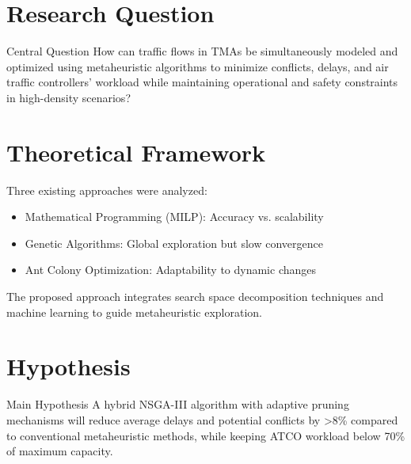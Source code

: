 \begin{minipage}{0.47\textwidth}

    \section{Research Question}
    \begin{questionBox}
        {Central Question}{
            How can traffic flows in TMAs be simultaneously modeled and optimized using metaheuristic algorithms to minimize conflicts, delays, and air traffic controllers' workload while maintaining operational and safety constraints in high-density scenarios?
        }
    \end{questionBox}

    \section{Theoretical Framework}
    Three existing approaches were analyzed:
    \begin{itemize}[itemsep=1mm]\small
        \item Mathematical Programming (MILP): Accuracy vs. scalability
        \item Genetic Algorithms: Global exploration but slow convergence
        \item Ant Colony Optimization: Adaptability to dynamic changes
    \end{itemize}
    The proposed approach integrates search space decomposition techniques and machine learning to guide metaheuristic exploration.
    \section{Hypothesis}
    \begin{questionBox}
        {Main Hypothesis}{
            A hybrid NSGA-III algorithm with adaptive pruning mechanisms will reduce average delays and potential conflicts by >8\% compared to conventional metaheuristic methods, while keeping ATCO workload below 70\% of maximum capacity.
        }
    \end{questionBox}
\end{minipage}
